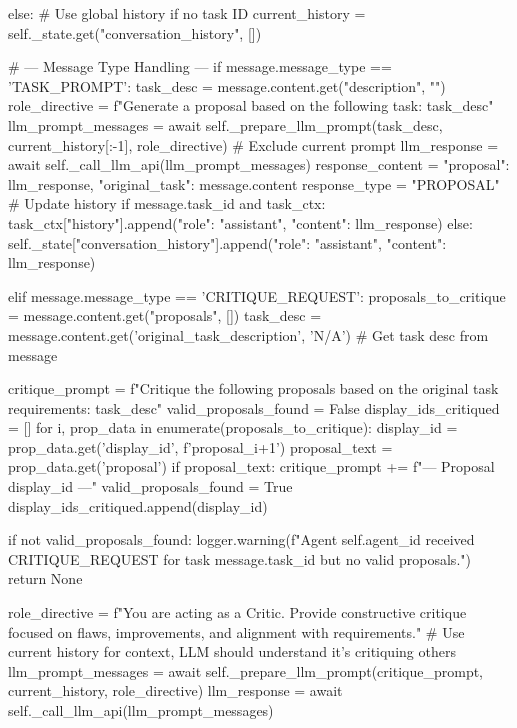 \documentclass{amsbook}
\theoremstyle{definition}
\theoremstyle{remark}
\numberwithin{equation}{chapter} %
\begin{document}
\begin{python}
            else: # Use global history if no task ID
                 current_history = self._state.get("conversation_history", [])


            # --- Message Type Handling ---
            if message.message_type == 'TASK_PROMPT':
                 task_desc = message.content.get("description", "")
                 role_directive = f"Generate a proposal based on the following task: {task_desc}"
                 llm_prompt_messages = await self._prepare_llm_prompt(task_desc, current_history[:-1], role_directive) # Exclude current prompt
                 llm_response = await self._call_llm_api(llm_prompt_messages)
                 response_content = {"proposal": llm_response, "original_task": message.content}
                 response_type = "PROPOSAL"
                 # Update history
                 if message.task_id and task_ctx: task_ctx["history"].append({"role": "assistant", "content": llm_response})
                 else: self._state["conversation_history"].append({"role": "assistant", "content": llm_response})


            elif message.message_type == 'CRITIQUE_REQUEST':
                 proposals_to_critique = message.content.get("proposals", [])
                 task_desc = message.content.get('original_task_description', 'N/A') # Get task desc from message

                 critique_prompt = f"Critique the following proposals based on the original task requirements: {task_desc}\n\n"
                 valid_proposals_found = False
                 display_ids_critiqued = []
                 for i, prop_data in enumerate(proposals_to_critique):
                     display_id = prop_data.get('display_id', f'proposal_{i+1}')
                     proposal_text = prop_data.get('proposal')
                     if proposal_text:
                         critique_prompt += f"--- Proposal {display_id} ---\n\n"
                         valid_proposals_found = True
                         display_ids_critiqued.append(display_id)

                 if not valid_proposals_found:
                     logger.warning(f"Agent {self.agent_id} received CRITIQUE_REQUEST for task {message.task_id} but no valid proposals.")
                     return None

                 role_directive = f"You are acting as a Critic. Provide constructive critique focused on flaws, improvements, and alignment with requirements."
                 # Use current history for context, LLM should understand it's critiquing others
                 llm_prompt_messages = await self._prepare_llm_prompt(critique_prompt, current_history, role_directive)
                 llm_response = await self._call_llm_api(llm_prompt_messages)


\end{python}
\end{document}
